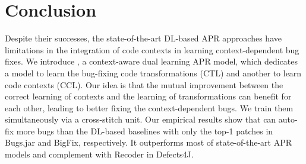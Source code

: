 \section{Conclusion}


Despite their successes, the state-of-the-art DL-based APR approaches
have limitations in the integration of code contexts in learning
context-dependent bug fixes. We introduce {\tool}, a context-aware
dual learning APR model, which dedicates a model to learn the
bug-fixing code transformations (CTL) and another to learn code
contexts (CCL). Our idea is that the mutual improvement between the
correct learning of contexts and the learning of transformations can
benefit for each other, leading to better fixing the context-dependent
bugs.
%
We train them simultaneously
via a cross-stitch unit.
Our empirical results show that {\tool} can auto-fix
more bugs than the DL-based baselines with only
the top-1 patches in Bugs.jar and BigFix, respectively.
It outperforms most of state-of-the-art APR models and complement with Recoder in Defects4J.
